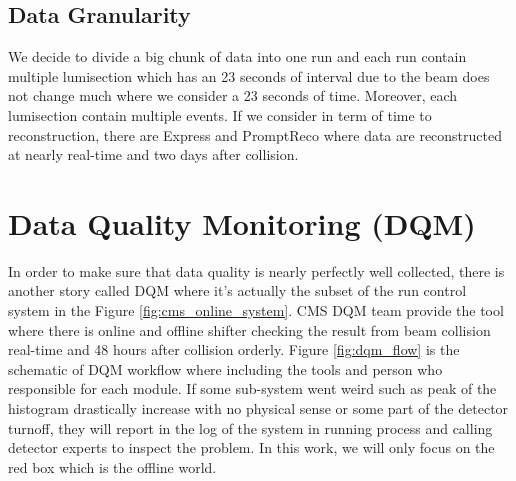 \subsection{Data Granularity}

We decide to divide a big chunk of data into one run and each run contain multiple lumisection which has an 23 seconds of interval due to the beam does not change much where we consider a 23 seconds of time.
Moreover, each lumisection contain multiple events. If we consider in term of time to reconstruction, there are Express and PromptReco where data are reconstructed at nearly real-time and two days after collision.




\section{Data Quality Monitoring (DQM)}

In order to make sure that data quality is nearly perfectly well collected, there is another story called DQM where it's actually the subset of the run control system in the Figure \ref{fig:cms_online_system}.
CMS DQM team provide the tool where there is online and offline shifter checking the result from beam collision real-time and 48 hours after collision orderly. Figure \ref{fig:dqm_flow} is the schematic of DQM workflow where including the tools and person who responsible for each module.
If some sub-system went weird such as peak of the histogram drastically increase with no physical sense or some part of the detector turnoff, they will report in the log of the system in running process and calling detector experts to inspect the problem.
In this work, we will only focus on the red box which is the offline world.

